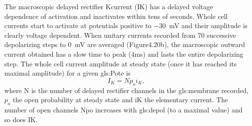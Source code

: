 \documentclass[class={myRUCProject}, crop=false]{standalone}
\begin{document}
The macroscopic delayed rectifier \gls{K}current (IK) has a delayed voltage dependence of activation and inactivates within tens of seconds. Whole cell currents start to activate at potentials positive to \qty{-30}{\mV} and their amplitude is clearly voltage dependent. When unitary currents recorded from 70 successive depolarizing steps to \qty{0}{\mV} are averaged (Figure4.20b), the macroscopic outward current obtained has a slow time to peak (4ms) and lasts the entire depolarizing step. The whole cell current amplitude at steady state (once it has reached its maximal amplitude) for a given \gls{gls:Pote} is
\[I_K= N p_o i_K,\]
where N is the number of delayed rectifier channels in the \gls{gls:membrane} recorded, \(p_o\) the open probability at steady state and iK the elementary current. The number of open channels Npo increases with \gls{gls:depol} (to a maximal value) and so does IK. 
\end{document}
